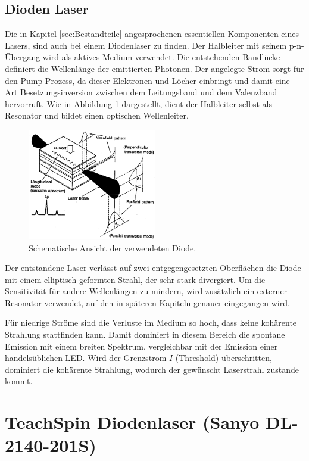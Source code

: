 \subsection{Dioden Laser}
Die in Kapitel \ref{sec:Bestandteile} angesprochenen essentiellen Komponenten eines Lasers, sind auch bei einem Diodenlaser zu finden. Der Halbleiter mit seinem p-n-Übergang wird als aktives Medium verwendet. Die entstehenden Bandlücke definiert die Wellenlänge der emittierten Photonen. Der angelegte Strom sorgt für den Pump-Prozess, da dieser Elektronen und Löcher einbringt und damit eine Art Besetzungsinversion zwischen dem Leitungsband und dem Valenzband hervorruft. Wie in Abbildung \ref{theo2} dargestellt, dient der Halbleiter selbst als Resonator und bildet einen optischen Wellenleiter. 

\begin{figure}[H]
\centering
\includegraphics[width=0.5\textwidth]{ressources/Diode.png}
\caption{Schematische Ansicht der verwendeten Diode. \cite{skript}}
\label{theo2}
\end{figure}

Der entstandene Laser verlässt auf zwei entgegengesetzten Oberflächen die Diode mit einem elliptisch geformten Strahl, der sehr stark divergiert. Um die Sensitivität für andere Wellenlängen zu mindern, wird zusätzlich ein externer Resonator verwendet, auf den in späteren Kapiteln genauer eingegangen wird.

Für niedrige Ströme sind die Verluste im Medium so hoch, dass keine kohärente Strahlung stattfinden kann. Damit dominiert in diesem Bereich die spontane Emission mit einem breiten Spektrum, vergleichbar mit der Emission einer handelsüblichen LED. Wird der Grenzstrom $I$ (Threshold) überschritten, dominiert die kohärente Strahlung, wodurch der gewünscht Laserstrahl zustande kommt.

\section{TeachSpin Diodenlaser (Sanyo DL-2140-201S)} 

